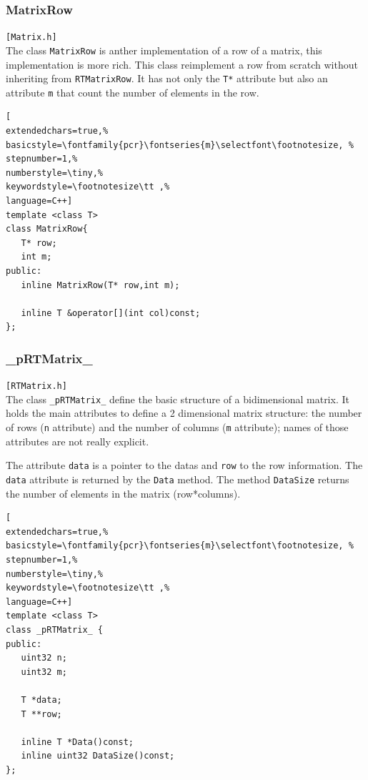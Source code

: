 \subsubsection{MatrixRow}
\texttt{[Matrix.h]}\\
The class \texttt{MatrixRow} is anther implementation of a row of a matrix, this implementation is more rich. This class reimplement a row from scratch without inheriting from \texttt{RTMatrixRow}. It has not only the \texttt{T*} attribute but also an attribute \texttt{m} that count the number of elements in the row.

\begin{lstlisting}[
extendedchars=true,%
basicstyle=\fontfamily{pcr}\fontseries{m}\selectfont\footnotesize, %
stepnumber=1,%
numberstyle=\tiny,%
keywordstyle=\footnotesize\tt ,%
language=C++]
template <class T>
class MatrixRow{
   T* row;
   int m;
public:
   inline MatrixRow(T* row,int m);

   inline T &operator[](int col)const;
};
\end{lstlisting}



\subsubsection{\_pRTMatrix\_}
\texttt{[RTMatrix.h]}\\
The class \texttt{\_pRTMatrix\_} define the basic structure of a bidimensional matrix. It holds the main attributes to define a 2 dimensional matrix structure: the number of rows (\texttt{n} attribute) and the number of columns (\texttt{m} attribute); names of those attributes are not really explicit.

The attribute \texttt{data} is a pointer to the datas and \texttt{row} to the row information. The \texttt{data} attribute is returned by the \texttt{Data} method.
The method \texttt{DataSize} returns the number of elements in the matrix (row*columns).

\begin{lstlisting}[
extendedchars=true,%
basicstyle=\fontfamily{pcr}\fontseries{m}\selectfont\footnotesize, %
stepnumber=1,%
numberstyle=\tiny,%
keywordstyle=\footnotesize\tt ,%
language=C++]
template <class T>
class _pRTMatrix_ {
public:
   uint32 n;
   uint32 m;
   
   T *data;
   T **row;

   inline T *Data()const;
   inline uint32 DataSize()const;
};
\end{lstlisting}



